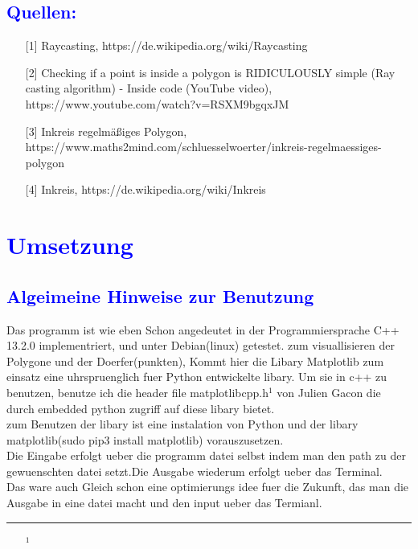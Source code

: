 \documentclass{article}
\begin{document}
\subsection{\textcolor{blue}{Quellen:}}
\begin{itemize}
\item[\normalsize{[1]}] \normalsize{Raycasting, https://de.wikipedia.org/wiki/Raycasting}
\item[\normalsize{[2]}] \normalsize{Checking if a point is inside a polygon is RIDICULOUSLY simple (Ray casting algorithm) - Inside code (YouTube video), https://www.youtube.com/watch?v=RSXM9bgqxJM}
\item[\normalsize{[3]}] \normalsize{Inkreis regelmäßiges Polygon, https://www.maths2mind.com/schluesselwoerter/inkreis-regelmaessiges-polygon}
\item[\normalsize{[4]}] \normalsize{Inkreis, https://de.wikipedia.org/wiki/Inkreis}
\end{itemize}
\section{\textcolor{blue}{Umsetzung}}
\subsection{\textcolor{blue}{Algeimeine Hinweise zur Benutzung}}
Das programm ist wie eben Schon angedeutet in der Programmiersprache C++ 13.2.0 implementriert, und unter Debian(linux) getestet. zum visuallisieren der Polygone und der Doerfer(punkten), Kommt hier die Libary Matplotlib zum einsatz eine uhrspruenglich fuer Python entwickelte libary. Um sie in c++ zu benutzen, benutze ich die header file matplotlibcpp.h$^1$ von Julien Gacon die durch embedded python zugriff auf diese libary bietet.
\\
zum Benutzen der libary ist eine instalation von Python und der libary matplotlib(sudo pip3 install matplotlib) vorauszusetzen.
\\
Die Eingabe erfolgt ueber die programm datei selbst indem man den path zu der gewuenschten datei setzt.Die Ausgabe wiederum erfolgt ueber das Terminal.
\\
 Das ware auch Gleich schon eine optimierungs idee fuer die Zukunft, das man die Ausgabe in eine datei macht und den input ueber das Termianl.
\vspace{5pt}
\hrule
\begin{itemize}
\item[$^1$] 
\end{itemize}
\end{document}
